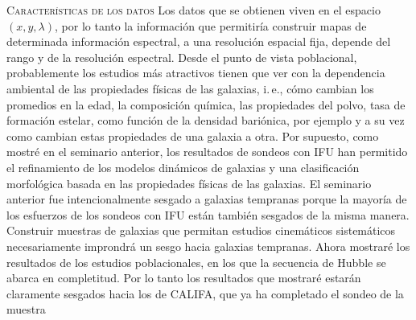 \documentclass[xcolor=dvipsnames,4pt,hyperref={colorlinks,citecolor=black,linkcolor=black,urlcolor=black}]{beamer}
\begin{document}
\begin{frame}[allowframebreaks]{\textsc{Características de los datos}}
%
Los datos que se obtienen viven en el espacio $(x,y,\lambda)$, por lo tanto la información que
permitiría construir mapas de determinada información espectral, a una resolución espacial fija,
depende del rango y de la resolución espectral. Desde el punto de vista poblacional, probablemente
los estudios más atractivos tienen que ver con la dependencia ambiental de las propiedades físicas
de las galaxias, i.\,e., cómo cambian los promedios en la edad, la composición química, las
propiedades del polvo, tasa de formación estelar, como función de la densidad bariónica, por ejemplo
y a su vez como cambian estas propiedades de una galaxia a otra.
%
Por supuesto, como mostré en el seminario anterior, los resultados de sondeos con IFU han permitido
el refinamiento de los modelos dinámicos de galaxias y una clasificación morfológica basada en las
propiedades físicas de las galaxias.
%
El seminario anterior fue intencionalmente sesgado a galaxias tempranas porque la mayoría de los
esfuerzos de los sondeos con IFU están también sesgados de la misma manera. Construir muestras de
galaxias que permitan estudios cinemáticos sistemáticos necesariamente improndrá un sesgo hacia
galaxias tempranas. Ahora mostraré los resultados de los estudios poblacionales, en los que la
secuencia de Hubble se abarca en completitud. Por lo tanto los resultados que mostraré estarán
claramente sesgados hacia los de CALIFA, que ya ha completado el sondeo de la muestra
%
%
\end{frame}
\end{document}
